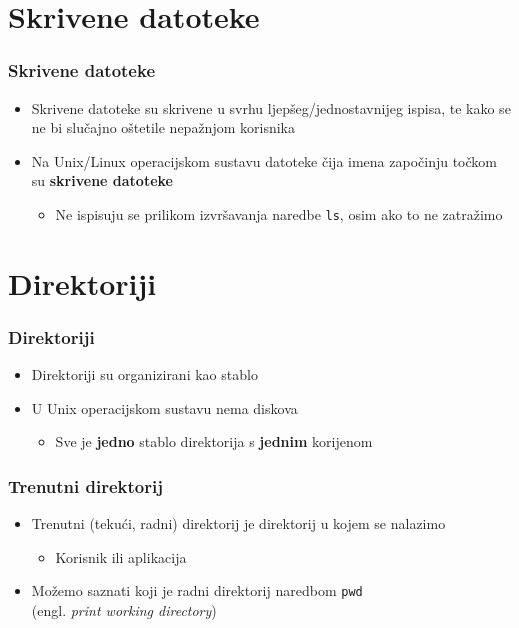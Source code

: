 \documentclass{beamer}
\begin{document}
\section{Skrivene datoteke}
\begin{frame}[t]
\frametitle{Skrivene datoteke}
\begin{itemize}
  \item Skrivene datoteke su skrivene u svrhu ljepšeg/jednostavnijeg ispisa, te kako se ne bi slučajno oštetile nepažnjom korisnika
  \item Na Unix/Linux operacijskom sustavu datoteke čija imena započinju
        točkom su \textbf{skrivene datoteke}
  \begin{itemize}
    \item Ne ispisuju se prilikom izvršavanja naredbe \texttt{ls}, osim
          ako to ne zatražimo
  \end{itemize}
\end{itemize}
\end{frame}

\section{Direktoriji}
\begin{frame}[t]
\frametitle{Direktoriji}
\begin{itemize}
  \item Direktoriji su organizirani kao stablo
  \item U Unix operacijskom sustavu nema diskova
  \begin{itemize}
    \item Sve je \textbf{jedno} stablo direktorija s \textbf{jednim} 
          korijenom
  \end{itemize}
  \centering
\end{itemize}
\end{frame} 


\begin{frame}[t]
\frametitle{Trenutni direktorij}
\begin{itemize}
  \item Trenutni (tekući, radni) direktorij je direktorij u kojem se
        nalazimo
  \begin{itemize}
    \item Korisnik ili aplikacija
  \end{itemize}
  \item Možemo saznati koji je radni direktorij naredbom \texttt{pwd} 
        \\(engl. \emph{print working directory})
\end{itemize}
\end{frame}
\end{document}

